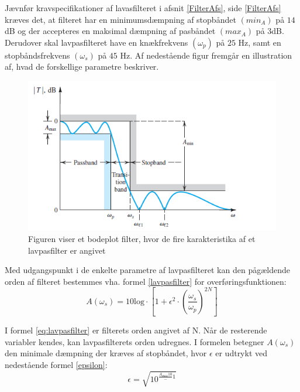 Jævnfør kravspecifikationer af lavasfilteret i afsnit \ref{FilterAfs}, side \ref{FilterAfs} kræves det, at filteret har en minimumsdæmpning af stopbåndet $(min_{A})$ på $14$dB og der accepteres en maksimal dæmpning af pasbåndet $(max_{A})$ på $3$dB. Derudover skal lavpasfilteret have en knækfrekvens $(\omega _p)$ på $25$ Hz, samt en stopbåndsfrekvens $(\omega _s)$ på $45$ Hz. Af nedestående figur  fremgår en illustration af, hvad de forskellige parametre beskriver.

\begin{figure}[H]
	\centering
	\includegraphics[scale=0.8]{figures/cProblemloesning/Lavpasfilter_generisk.PNG}
	\caption{Figuren viser et bodeplot filter, hvor de fire karakteristika af et lavpasfilter er angivet}
	\label{fig:Lavpasfilter_generisk}
\end{figure}

\noindent Med udgangspunkt i de enkelte parametre af lavpasfilteret kan den pågældende orden af filteret bestemmes vha. formel \eqref{lavpasfilter} for overføringsfunktionen:
\begin{equation} \label{eq:lavpasfilter}
A(\omega_s) = 10 \text{log} \cdot \left[1 + \epsilon^2 \cdot (\frac{\omega _s}{\omega _p})^{2N}\right] 
\end{equation}

\noindent I formel \eqref{eq:lavpasfilter} er filterets orden angivet af N. Når de resterende variabler kendes, kan lavpasfilterets orden udregnes. I formelen betegner $A(\omega _s)$ den minimale dæmpning der kræves af stopbåndet, hvor $\epsilon$ er udtrykt ved nedestående formel \eqref{epsilon}:
\begin{equation}\label{eq:epsilon}
\epsilon = \sqrt{10^{\frac{A_{max}{10}} - 1}}
\end{equation}

